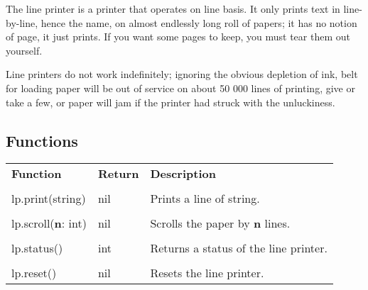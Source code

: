 The line printer is a printer that operates on line basis. It only prints text in line-by-line, hence the name, on almost endlessly long roll of papers; it has no notion of page, it just prints. If you want some pages to keep, you must tear them out yourself.

Line printers do not work indefinitely; ignoring the obvious depletion of ink, belt for loading paper will be out of service on about 50 000 lines of printing, give or take a few, or paper will jam if the printer had struck with the unluckiness.

\subsection{Functions}

\begin{tabularx}{\textwidth}{l l X}
	\textbf{\large Function} & \textbf{\large Return} & \textbf{\large Description}
	\\ \\
	\endhead
	lp.print(string) & nil & Prints a line of string.
	\\ \\
	lp.scroll(\textbf{n}: int) & nil & Scrolls the paper by \textbf{n} lines.
	\\ \\
	lp.status() & int & Returns a status of the line printer.
	\\ \\
	lp.reset() & nil & Resets the line printer.
\end{tabularx}
